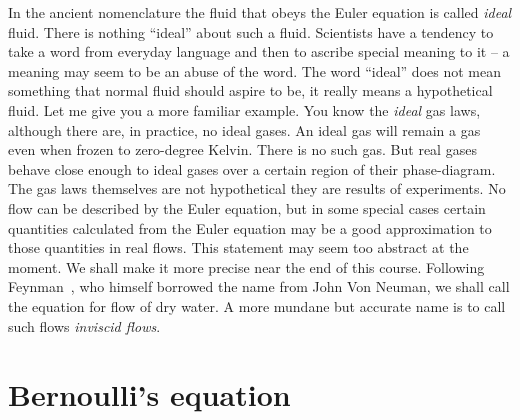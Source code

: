 In the ancient nomenclature the fluid that obeys the Euler equation is
called \textit{ideal} fluid.  There is nothing ``ideal'' about such a
fluid. Scientists have a tendency to take a word from everyday
language and then to ascribe special meaning to it -- a meaning may seem
to be an abuse of the word. The word ``ideal'' does not mean something
that normal fluid should aspire to be, it really means a hypothetical
fluid. Let me give you a more familiar example. 
You know the \textit{ideal} gas laws, although there are, in practice, no
ideal gases.  An ideal gas will remain a gas even when frozen to
zero-degree Kelvin. There is no such gas. But real gases behave close
enough  to ideal gases over a certain region of their phase-diagram. 
The gas laws themselves are not hypothetical they are results of
experiments. No flow can be described by the Euler equation, but in
some special cases certain quantities calculated from the Euler
equation may be a good approximation to those quantities in real
flows. This statement may seem too abstract at the moment. We shall
make it more precise near the end of this course. Following Feynman~\cite{Feynman77},
who himself borrowed the name from John Von Neuman, we shall call
 the equation for flow of dry water. A more mundane but
accurate name is to call such flows \textit{inviscid flows}. 

\section{Bernoulli's equation}


